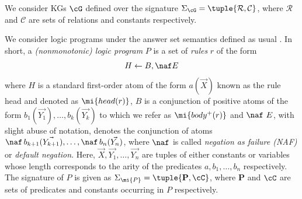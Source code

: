 We %
consider KGs $\cG$ defined over the signature
$\Sigma_{\cG}=\tuple{\mathcal{R},\mathcal{C}}$, where $\mathcal{R}$ and $\mathcal{C}$ are sets of
relations and constants respectively. 




We consider logic programs under the answer set semantics defined as usual \cite{GL1988}.
In short, a \emph{(nonmonotonic) logic program} $P$ is a set of \emph{rules} $r$ of the form
\begin{equation}
H\leftarrow B, \naf E
\end{equation}
\noindent where $H$ is a standard first-order atom of the form $a(\vec{X})$ known as the rule head and denoted as $\mi{head(r)}$, $B$ is a conjunction of positive atoms of the form $b_1(\vec{Y_1}),\dotsc,b_k(\vec{Y_k})$ to which we refer as $\mi{body^+(r)}$ and $\naf\ E$, with slight abuse of notation, denotes the conjunction of atoms $\naf\, b_{k+1}(\vec{Y_{k+1}}),\dotsc,\naf\, b_n(\vec{Y_{n}})$, where $\naf$ is called \emph{negation as failure (NAF)} or \emph{default negation}.
Here, $\vec{X},\vec{Y_1},\ldots,\vec{Y_{n}}$ are tuples of either constants or
variables whose length corresponds to the arity of the predicates
$a,b_1,\ldots,b_n$ respectively. The signature of $P$ is given as $\Sigma_{\mi{P}}=\tuple{\mathbf{P},\cC}$, where $\mathbf{P}$ and $\cC$ are sets of predicates and constants occurring in $P$ respectively. %

